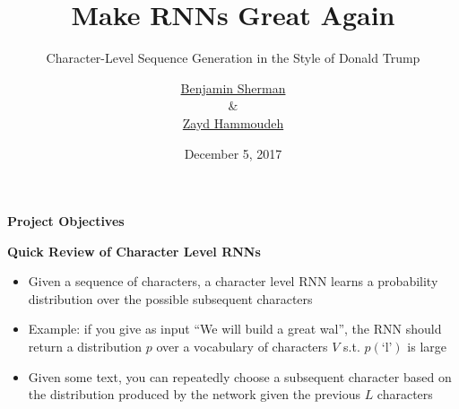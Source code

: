 \documentclass[10pt,aspectratio=169]{beamer}
\title[Trump-ian Speech Generation]%
{\textbf{Make RNNs Great Again}}
\subtitle{Character-Level Sequence Generation in the Style of Donald Trump}  %
\date{December 5, 2017}
\author[Sherman \& Hammoudeh] %
{
  \href{mailto:bcsherma@ucsc.edu}{Benjamin Sherman}\\
  \&\\  
  \href{mailto:zayd@ucsc.edu}{Zayd Hammoudeh}
}
\institute[
Dept.\ of Computer Science\\
UC, Santa Cruz\\
] %
{%
  Dept.\ of Computer Science\\
  University of California, Santa Cruz\\
  
}
\begin{document}
  {\begin{frame}{}{} %
    \titlepage
  \end{frame}}

	\begin{frame}{\textbf{Project Objectives}}
		
		\begin{itemize}
      \setlength\itemsep{1.5em}
  
    \end{itemize}
	\end{frame}
	
	\begin{frame}{\textbf{Quick Review of Character Level RNNs}}
		
		\begin{itemize}
			\item Given a sequence of characters, a character level RNN learns a probability distribution over the possible subsequent characters
			
			\item Example: if you give as input ``We will build a great wal'', the RNN should return a distribution $p$ over a vocabulary of characters $V$ s.t. $p(\text{`l'})$ is large
			
			\item Given some text, you can repeatedly choose a subsequent character based on the distribution produced by the network given the previous $L$ characters
			
		\end{itemize}
		
	\end{frame}
	
\end{document}
